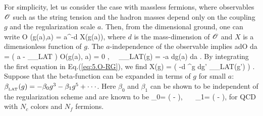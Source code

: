  For simplicity, let us consider the case with massless fermions, where 
 observables
   ${\cal O}$ such as the string tension and the hadron masses  depend only
   on the coupling $g$ and the  regularization scale $a$. 
   Then,  from the dimensional ground, one can  write  
     \beq
\label{eq:5.O-dim}
 {\cal O} (g(a),a) = a^{-d} X(g(a)),
 \eeq
 where $d$ is the mass-dimension of ${\cal O}$ and $X$ is a dimensionless
 function of $g$.  The $a$-independence of the observable implies
 \beq
\label{eq:5.O-RG}
 a{d{\cal O} \over da} 
  =  
  \left( a  
 - \beta_{_{\rm LAT}}   \right) {\cal O}(g(a), a)  = 0 , 
\ \   \beta_{_{\rm LAT}}(g) =  -a {dg(a) \over da} .
\eeq
By integrating the first equation in Eq.(\ref{eq:5.O-RG}),  we find
\beq
\label{eq:5.lat-F}
 X(g) = 
 \exp \left( -d \int^g {dg' \over \beta_{_{\rm LAT}}(g')} \right) .
 \eeq
Suppose that 
 the beta-function can be expanded in terms of $g$ for small $a$:
$\beta_{_{\rm LAT}}(g)   = 
  - \beta_0 g^3 - \beta_1  g^5 + \cdot \cdot \cdot $. Here
  $\beta_0$ and $\beta_1$ can be shown to be independent of the 
   regularization scheme and are known to be 
\beq
\beta_0=  \left( - \right),
\ \ \  \beta_1=  \left( - \right),
\eeq
           for QCD with $N_c$ colors and     $N_f$ fermions.
  
